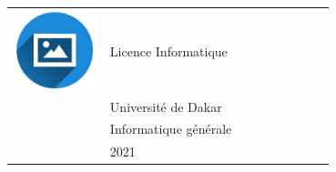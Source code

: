 \documentclass{article}
\begin{document}
\begin{paracol}{2}
 \begin{tabular}{@{}cp{0.7\linewidth}}
      \begin{minipage}{0.05\linewidth}
        \includegraphics[width=\linewidth]{picon.png}
      \end{minipage} & \vspace{-12pt}
      {\color{sidetext} {Licence Informatique}} \\[-6pt]
      & Université de Dakar \\
      & Informatique générale \\
      & 2021 
    \end{tabular}


\end{paracol}
\end{document}
